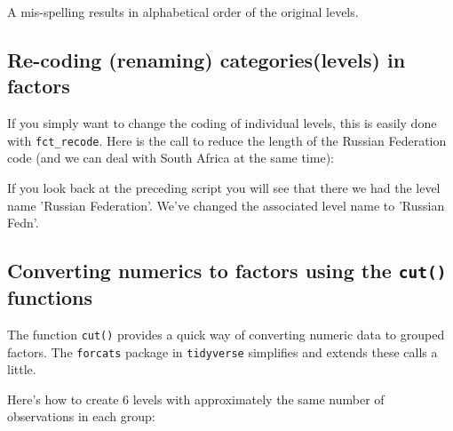 \documentclass[titlepage]{book}\usepackage{knitr}
\begin{document}
A mis-spelling results in alphabetical order of the original levels.

\subsection{ Re-coding (renaming) categories(levels) in factors}

If you simply want to change the coding of individual levels, this is easily done with \texttt{fct\_recode}.  Here is the call to reduce the length of the Russian Federation code (and we can deal with South Africa at the same time):


\begin{knitrout}
\color{fgcolor}
\end{knitrout}
  If you look back at the preceding script you will see that there we had the level name 'Russian Federation'.  We've changed the associated level name to 'Russian Fedn'.  
 
\subsection{ Converting numerics to factors using the \texttt{cut()} functions}

The function \texttt{cut()} provides a quick  way of converting numeric data to grouped factors. The \texttt{forcats} package in \texttt{tidyverse} simplifies and extends these calls a little.

Here's how to create 6 levels with approximately the same number of observations in each group:

\begin{knitrout}
\color{fgcolor}
\end{knitrout}
\end{document}

